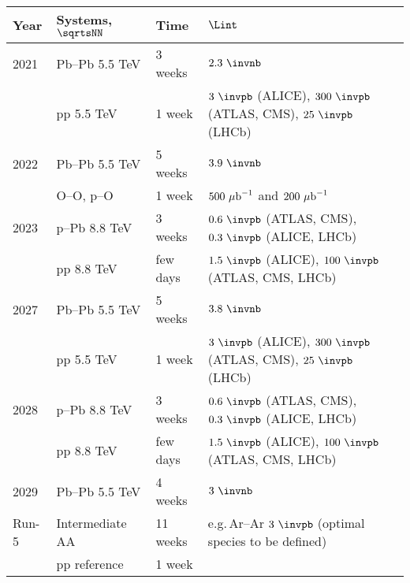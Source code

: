 \documentclass[../report.tex]{subfiles}
\begin{document}
\begin{center}
\begin{tabular}{llll}
Year & Systems, $\sqrtsNN$ & Time & $\Lint$ \\
\hline
2021 &  Pb--Pb 5.5 TeV & 3 weeks & $2.3~\invnb$ \\
     &  pp 5.5 TeV & 1 week & $3~\invpb$ (ALICE), $300~\invpb$ (ATLAS, CMS), $25~\invpb$ (LHCb)  \\
\hline
2022 &  Pb--Pb 5.5 TeV & 5 weeks & $3.9~\invnb$ \\
     &  O--O, p--O & 1 week & $500~{\rm \mu b}^{-1}$ and $200~{\rm \mu b}^{-1}$ \\
\hline
2023 &  p--Pb 8.8 TeV & 3 weeks & $0.6~\invpb$ (ATLAS, CMS), $0.3~\invpb$ (ALICE, LHCb) \\
     &  pp 8.8 TeV & few days & $1.5~\invpb$ (ALICE), $100~\invpb$ (ATLAS, CMS, LHCb)  \\
\hline
2027 &  Pb--Pb 5.5 TeV & 5 weeks & $3.8~\invnb$ \\
     &  pp 5.5 TeV & 1 week & $3~\invpb$ (ALICE), $300~\invpb$ (ATLAS, CMS), $25~\invpb$ (LHCb)  \\
\hline
2028 &  p--Pb 8.8 TeV & 3 weeks & $0.6~\invpb$ (ATLAS, CMS), $0.3~\invpb$ (ALICE, LHCb) \\
     &  pp 8.8 TeV & few days & $1.5~\invpb$ (ALICE), $100~\invpb$ (ATLAS, CMS, LHCb)  \\
\hline
2029 &  Pb--Pb 5.5 TeV & 4 weeks & $3~\invnb$ \\
\hline
Run-5 & Intermediate AA & 11 weeks & e.g.\,Ar--Ar $3~\invpb$ (optimal species to be defined) \\
     &  pp reference & 1 week & \\
\hline
\end{tabular}
\end{center}
\end{document}
